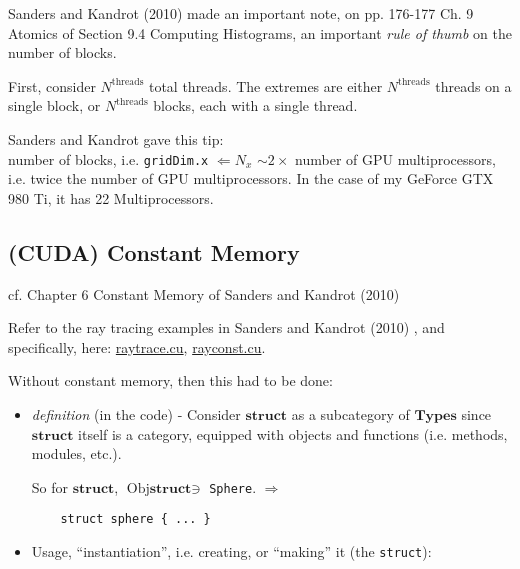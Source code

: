 \documentclass[10pt]{amsart}
\begin{document}
\begin{multicols*}{2}
 Sanders and Kandrot (2010) \cite{SK2010} made an important note, on pp. 176-177 Ch. 9 Atomics of Section 9.4 Computing Histograms, an important \emph{rule of thumb} on the number of blocks.

 First, consider $N^{\text{threads}}$ total threads.  The extremes are either $N^{\text{threads}}$ threads on a single block, or $N^{\text{threads}}$ blocks, each with a single thread.

 Sanders and Kandrot gave this tip:  \\

 number of blocks, i.e. \verb|gridDim.x| $\Longleftarrow N_x$ $\sim 2 \times $ number of GPU multiprocessors, i.e. twice the number of GPU multiprocessors.  In the case of my GeForce GTX 980 Ti, it has 22 Multiprocessors.  
 
\subsection{(CUDA) Constant Memory}
 
cf. Chapter 6 Constant Memory of Sanders and Kandrot (2010) \cite{SK2010}

Refer to the ray tracing examples in Sanders and Kandrot (2010) \cite{SK2010}, and specifically, here: \href{https://github.com/ernestyalumni/CompPhys/blob/master/CUDA-By-Example/raytrace.cu}{raytrace.cu}, \href{https://github.com/ernestyalumni/CompPhys/blob/master/CUDA-By-Example/rayconst.cu}{rayconst.cu}.

Without constant memory, then this had to be done: 

\begin{itemize}
\item \emph{definition} (in the code) - Consider $\textbf{struct}$ as a subcategory of $\textbf{Types}$ since $\textbf{struct}$ itself is a category, equipped with objects and functions (i.e. methods, modules, etc.).

  So for $\textbf{struct}$, $\text{Obj}\textbf{struct} \ni $ \verb|Sphere|.
  $\Longrightarrow $
  \begin{lstlisting}
    struct sphere { ... }
  \end{lstlisting}
\item Usage, ``instantiation'', i.e. creating, or ``making'' it (the \verb|struct|):


\end{itemize}
\end{multicols*}
\end{document}
